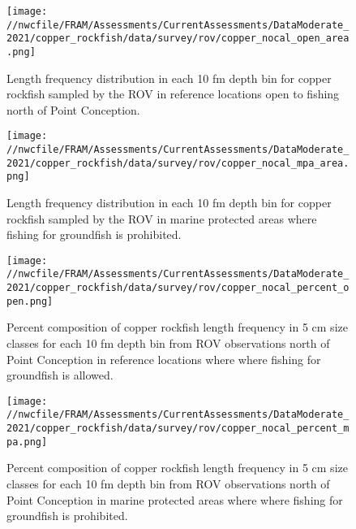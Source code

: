 \documentclass[11pt,
  english,
  a4paper,
]{article}
\begin{document}

\begin{figure}
\centering
\texttt{[image: //nwcfile/FRAM/Assessments/CurrentAssessments/DataModerate\_2021/copper\_rockfish/data/survey/rov/copper\_nocal\_open\_area.png]}
\caption{Length frequency distribution in each 10 fm depth bin for copper rockfish sampled by the ROV in reference locations open to fishing north of Point Conception.\label{fig:rov-open}}
\end{figure}

\tagmcend\tagstructend

\clearpage


\begin{figure}
\centering
\texttt{[image: //nwcfile/FRAM/Assessments/CurrentAssessments/DataModerate\_2021/copper\_rockfish/data/survey/rov/copper\_nocal\_mpa\_area.png]}
\caption{Length frequency distribution in each 10 fm depth bin for copper rockfish sampled by the ROV in marine protected areas where fishing for groundfish is prohibited.\label{fig:rov-mpa}}
\end{figure}

\tagmcend\tagstructend

\clearpage


\begin{figure}
\centering
\texttt{[image: //nwcfile/FRAM/Assessments/CurrentAssessments/DataModerate\_2021/copper\_rockfish/data/survey/rov/copper\_nocal\_percent\_open.png]}
\caption{Percent composition of copper rockfish length frequency in 5 cm size classes for each 10 fm depth bin from ROV observations north of Point Conception in reference locations where where fishing for groundfish is allowed.\label{fig:rov-percent-open}}
\end{figure}

\tagmcend\tagstructend

\clearpage


\begin{figure}
\centering
\texttt{[image: //nwcfile/FRAM/Assessments/CurrentAssessments/DataModerate\_2021/copper\_rockfish/data/survey/rov/copper\_nocal\_percent\_mpa.png]}
\caption{Percent composition of copper rockfish length frequency in 5 cm size classes for each 10 fm depth bin from ROV observations north of Point Conception in marine protected areas where where fishing for groundfish is prohibited.\label{fig:rov-percent-mpa}}
\end{figure}
\end{document}
